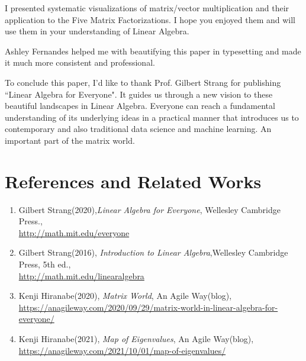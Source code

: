 \documentclass[letterpaper]{article}
\begin{document}
I presented systematic visualizations of matrix/vector multiplication and
their application to the Five Matrix Factorizations. I hope you
enjoyed them and will use them
in your understanding of Linear Algebra.

Ashley Fernandes helped me with beautifying this paper in typesetting
and made it much more consistent and professional.

To conclude this paper, I'd like to thank Prof. Gilbert Strang for
publishing ``Linear Algebra for Everyone". It guides us
through a new vision to these beautiful landscapes in Linear Algebra.
Everyone can reach a fundamental understanding of its underlying ideas
in a practical manner that introduces us to contemporary and also
traditional data science and machine learning. An important part of the matrix world.

\section*{References and Related Works}
\begin{enumerate}
  \item 
  Gilbert Strang(2020),\emph{Linear Algebra for Everyone}, Wellesley Cambridge Press.,\\
  \href{http://math.mit.edu/everyone}{http://math.mit.edu/everyone}
  \item
  Gilbert Strang(2016), \emph{Introduction to Linear Algebra},Wellesley Cambridge Press, 5th ed.,\\
  \href{http://math.mit.edu/linearalgebra}{http://math.mit.edu/linearalgebra}
  \item Kenji Hiranabe(2020), \emph{Matrix World}, An Agile Way(blog),\\
  \href{https://anagileway.com/2020/09/29/matrix-world-in-linear-algebra-for-everyone/}{https://anagileway.com/2020/09/29/matrix-world-in-linear-algebra-for-everyone/}
  \item Kenji Hiranabe(2021), \emph{Map of Eigenvalues}, An Agile Way(blog),\\
  \href{https://anagileway.com/2021/10/01/map-of-eigenvalues/}{https://anagileway.com/2021/10/01/map-of-eigenvalues/}
\end{enumerate}
\end{document}
